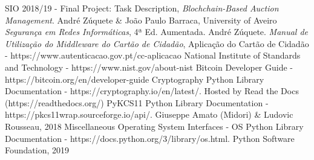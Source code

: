 \documentclass[a4paper]{article}
\begin{document}
\begin{thebibliography}{9} %
SIO 2018/19 - Final Project: Task Description, \emph{Blochchain-Based Auction Management}. André Zúquete \& João Paulo Barraca, University of Aveiro
\emph{Segurança em Redes Informáticas}, 4ª Ed. Aumentada. André Zúquete.
\emph{Manual de Utilização do Middleware do Cartão de Cidadão}, Aplicação do Cartão de Cidadão - https://www.autenticacao.gov.pt/cc-aplicacao
National Institute of Standards and Technology - https://www.nist.gov/about-nist
Bitcoin Developer Guide - https://bitcoin.org/en/developer-guide
Cryptography Python Library Documentation - https://cryptography.io/en/latest/. Hosted by Read the Docs (https://readthedocs.org/)
PyKCS11 Python Library Documentation - https://pkcs11wrap.sourceforge.io/api/. Giuseppe Amato (Midori) \& Ludovic Rousseau, 2018
Miscellaneous Operating System Interfaces - OS Python Library Documentation - https://docs.python.org/3/library/os.html. Python Software Foundation, 2019
\end{thebibliography}
\end{document}
